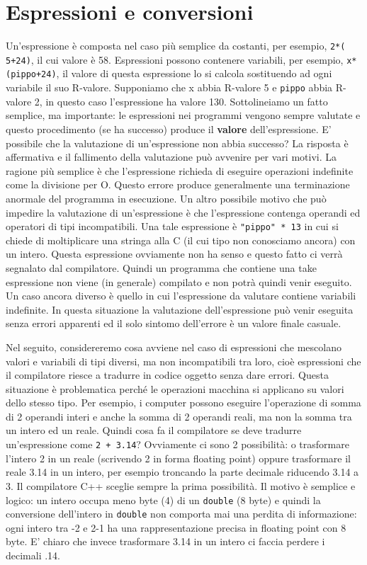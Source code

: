 \documentclass[a4paper,12pt]{book}
\begin{document}
\section{Espressioni e conversioni}
Un'espressione è composta nel caso più semplice da costanti, per esempio, \texttt{2*( 5+24)}, il cui valore è 58.
Espressioni possono contenere variabili, per esempio, \texttt{x*(pippo+24)}, il valore di questa espressione lo si calcola sostituendo ad ogni variabile il suo R-valore.
Supponiamo che x abbia R-valore 5 e \texttt{pippo} abbia R-valore 2, in questo caso l'espressione ha valore 130.
Sottolineiamo un fatto semplice, ma importante: le espressioni nei programmi vengono sempre valutate e questo procedimento (se ha successo) produce il \textbf{valore} dell'espressione.
E' possibile che la valutazione di un'espressione non abbia successo?
La risposta è affermativa e il fallimento della valutazione può avvenire per vari motivi.
La ragione più semplice è che l'espressione richieda di eseguire operazioni indefinite come la divisione per O.
Questo errore produce generalmente una terminazione anormale del programma in esecuzione.
Un altro possibile motivo che può impedire la valutazione di un'espressione è che l'espressione contenga operandi ed operatori di tipi incompatibili.
Una tale espressione è \texttt{"pippo" * 13} in cui si chiede di moltiplicare una stringa alla C (il cui tipo non conosciamo ancora) con un intero.
Questa espressione ovviamente non ha senso e questo fatto ci verrà segnalato dal compilatore.
Quindi un programma che contiene una take espressione non viene (in generale) compilato e non potrà quindi venir eseguito.
Un caso ancora diverso è quello in cui l'espressione da valutare contiene variabili indefinite.
In questa situazione la valutazione dell'espressione può venir eseguita senza errori apparenti ed il solo sintomo dell'errore è un valore finale casuale.

Nel seguito, considereremo cosa avviene nel caso di espressioni che mescolano valori e variabili di tipi diversi, ma non incompatibili tra loro, cioè espressioni che il compilatore riesce a tradurre in codice oggetto senza dare errori.
Questa situazione è problematica perché le operazioni macchina si applicano su valori dello stesso tipo.
Per esempio, i computer possono eseguire l'operazione di somma di 2 operandi interi e anche la somma di 2 operandi reali, ma non la somma tra un intero ed un reale.
Quindi cosa fa il compilatore se deve tradurre un'espressione come \texttt{2 + 3.14}?
Ovviamente ci sono 2 possibilità: o trasformare l'intero 2 in un reale (scrivendo 2 in forma floating point) oppure trasformare il reale 3.14 in un intero, per esempio troncando la parte decimale riducendo 3.14 a 3.
Il compilatore C++ sceglie sempre la prima possibilità.
Il motivo è semplice e logico: un intero occupa meno byte (4) di un \texttt{double} (8 byte) e quindi la conversione dell'intero in \texttt{double} non comporta mai una perdita di informazione: ogni intero tra -2 e 2-1 ha una rappresentazione precisa in floating point con 8 byte.
E' chiaro che invece trasformare 3.14 in un intero ci faccia perdere i decimali .14.
\end{document}
